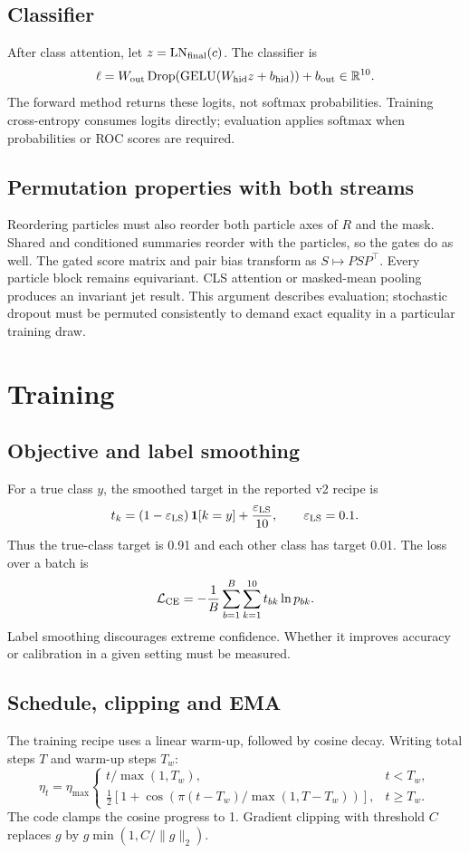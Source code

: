 \documentclass[11pt,a4paper]{article}
\newcommand{\R}{\mathbb R}
\newcommand{\LN}{\operatorname{LN}}
\newcommand{\GELU}{\operatorname{GELU}}
\newcommand{\Drop}{\operatorname{Drop}}
\numberwithin{equation}{section}
\begin{document}
\subsection{Classifier}
After class attention, let $z=\LN_{\rm final}(c)$. The classifier is
\[
 \ell=W_{\rm out}\Drop(\GELU(W_{\rm hid}z+b_{\rm hid}))+b_{\rm out}
       \in\R^{10}.
\]
The forward method returns these logits, not softmax probabilities.
Training cross-entropy consumes logits directly; evaluation applies
softmax when probabilities or ROC scores are required.

\subsection{Permutation properties with both streams}
Reordering particles must also reorder both particle axes of $R$ and the
mask. Shared and conditioned summaries reorder with the particles, so the
gates do as well. The gated score matrix and pair bias transform as
$S\mapsto PSP^\top$. Every particle block remains equivariant.
CLS attention or masked-mean pooling produces an invariant jet result.
This argument describes evaluation; stochastic dropout must be permuted
consistently to demand exact equality in a particular training draw.

\section{Training}\label{sec:training}
\subsection{Objective and label smoothing}
For a true class $y$, the smoothed target in the reported v2 recipe is
\[
 t_k=(1-\varepsilon_{\rm LS})\,\mathbf1[k=y]
           +\frac{\varepsilon_{\rm LS}}{10},\qquad
 \varepsilon_{\rm LS}=0.1.
\]
Thus the true-class target is 0.91 and each other class has target 0.01.
The loss over a batch is
\[
 \mathcal L_{\rm CE}
 =-\frac1B\sum_{b=1}^{B}\sum_{k=1}^{10}t_{bk}\ln p_{bk}.
\]
Label smoothing discourages extreme confidence. Whether it improves
accuracy or calibration in a given setting must be measured.

\subsection{Schedule, clipping and EMA}
The training recipe uses a linear warm-up, followed by cosine decay.
Writing total steps $T$ and warm-up steps $T_w$:
\[
 \eta_t=\eta_{\max}
 \begin{cases}
 t/\max(1,T_w),&t<T_w,\\
 \tfrac12[1+\cos(\pi(t-T_w)/\max(1,T-T_w))],&t\ge T_w.
 \end{cases}
\]
The code clamps the cosine progress to 1. Gradient clipping with threshold
$C$ replaces $g$ by $g\min(1,C/\|g\|_2)$.
\end{document}
